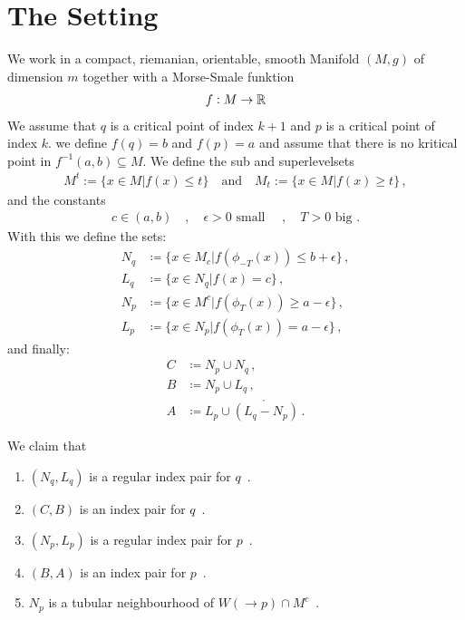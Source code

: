\pagestyle{empty}

\section*{The Setting}
We work in a compact, riemanian, orientable, smooth Manifold $(M,g)$ of dimension $m$ together with a Morse-Smale funktion 
\begin{align}
    f: M\to \mathbb{R}
\end{align}
We assume that $q$ is a critical point of index $k+1$ and $p$ is a critical point of index $k$. we define $f(q)=b$ and $f(p)=a$ and assume that there is no kritical point in $f^{-1}(a,b)\subseteq M$. We define the sub and superlevelsets 
\begin{align}
    M^t:=\{ x\in M | f(x)\leq t \} \quad \text{and}\quad M_t:=\{ x\in M | f(x)\geq t \} \, ,
\end{align} and the constants 
\begin{align}
    c \in (a,b) \quad , \quad \epsilon >0 \text{ small } \quad,\quad T>0 \text{ big .}
\end{align} With this we define the sets: 
\begin{align}
	N_q  & \coloneq    \{ x\in M_c |f(\phi_{-T}(x))  \leq b+ \epsilon  \}   \, ,  \\
	L_q  & \coloneq    \{ x\in N_q |f(x)             =    c            \}    \, , \\
	N_p  & \coloneq    \{ x\in M^c |f(\phi_T(x))     \geq a-\epsilon   \}    \, , \\
	L_p  & \coloneq    \{ x\in N_p |f( \phi_T(x))    =    a-\epsilon   \} \, ,
\end{align} and finally: 
\begin{align}
	C  & \coloneq  N_p \cup N_q  \, ,                     \\
	B  & \coloneq  N_p \cup L_q   \, ,                   \\
	A  & \coloneq  L_p \cup \mathring{(L_q-N_p)} \, .
\end{align}
\begin{lemma}
    We claim that 
    \begin{enumerate}
	\item $(N_q,L_q)$ is a regular index pair for $q$\, . \label{lem: enum: 1}
	\item $(C,B)$ is an index pair for $q$\, .\label{lem: enum: 2}
	\item $(N_p,L_p)$ is a regular index pair for $p$\, .\label{lem: enum: 3}
	\item $(B,A)$ is an index pair for $p$\, .\label{lem: enum: 4}
    \item $N_p$ is a tubular neighbourhood of $W(\to p)\cap M^c$\, .\label{lem: enum: 5}
\end{enumerate}
\end{lemma}
